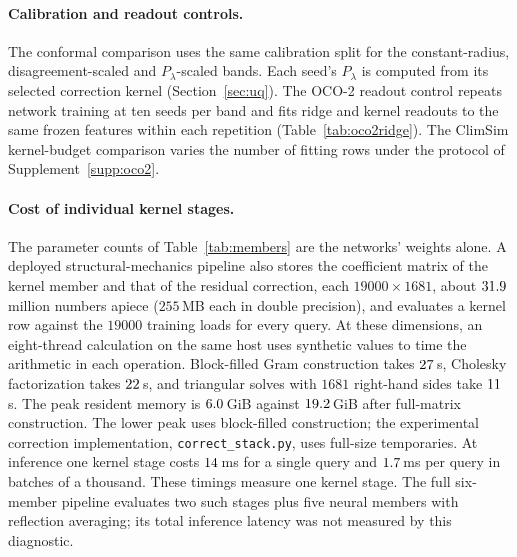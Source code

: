 \paragraph{Calibration and readout controls.} The conformal comparison
uses the same calibration split for the constant-radius,
disagreement-scaled and $P_\lambda$-scaled bands. Each seed's
$P_\lambda$ is computed from its selected correction kernel
(Section~\ref{sec:uq}). The OCO-2 readout control repeats network training
at ten seeds per band and fits ridge and kernel readouts to the same
frozen features within each repetition (Table~\ref{tab:oco2ridge}).
The ClimSim kernel-budget comparison varies the number of fitting rows
under the protocol of Supplement~\ref{supp:oco2}.

\paragraph{Cost of individual kernel stages.} The parameter counts of
Table~\ref{tab:members} are the networks' weights alone. A deployed
structural-mechanics pipeline also stores the coefficient matrix of the
kernel member and that of the residual correction, each $19000\times1681$,
about $31.9$ million numbers apiece ($255$\,MB each in double
precision), and evaluates a kernel row against the $19000$ training loads
for every query. At these dimensions, an eight-thread calculation on the same host uses
synthetic values to time the arithmetic in each operation. Block-filled
Gram construction takes $27$\,s, Cholesky factorization takes
$22$\,s, and triangular solves with $1681$ right-hand sides take
$11$\,s. The peak resident memory is $6.0$\,GiB against
$19.2$\,GiB after full-matrix construction. The lower peak uses block-filled construction; the
experimental correction implementation, \texttt{correct\_stack.py},
uses full-size temporaries.
At inference one kernel stage costs
$14$\,ms for a single query and $1.7$\,ms per
query in batches of a thousand. These timings measure one kernel stage.
The full six-member pipeline evaluates two such stages plus five neural
members with reflection averaging; its total inference latency was not
measured by this diagnostic.

